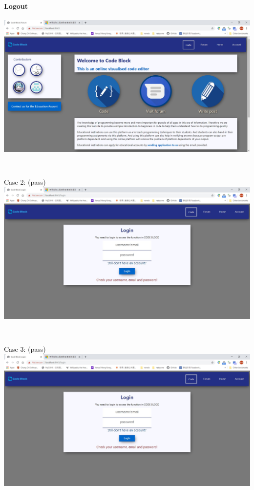 \paragraph{Logout}

\includegraphics[scale=0.45]{Doc/Pics/logout}

~

Case 2: (pass)\\
\includegraphics[scale=0.45]{Doc/Pics/case-5-2-2}

~

Case 3: (pass)\\
\includegraphics[scale=0.45]{Doc/Pics/case-5-2-3}

